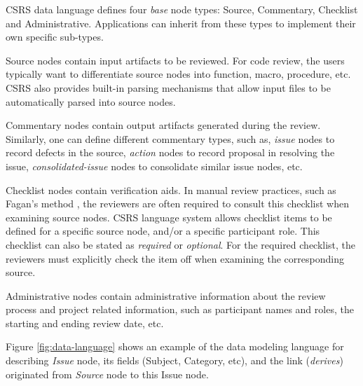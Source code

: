 CSRS data language defines four {\it base} node
types: Source, Commentary, Checklist and Administrative. 
Applications can inherit from these types to implement their own
specific sub-types.

Source nodes contain input artifacts to be reviewed. For code review,
the users typically want to differentiate source nodes into function,
macro, procedure, etc.  CSRS also provides built-in parsing mechanisms
that allow input files to be automatically parsed into source nodes. 

Commentary nodes contain output artifacts generated during the
review. Similarly, one can define different commentary types,
such as, {\it issue} nodes to record defects in the source,
{\it action} nodes to record proposal in resolving the issue, 
{\it consolidated-issue} nodes to consolidate similar issue nodes, etc.

Checklist nodes contain verification aids. In manual review practices,
such as Fagan's method \cite{Fagan76}, the reviewers are often required
to consult this checklist when examining source nodes. CSRS language
system allows checklist items to be defined for a specific source
node, and/or a specific participant role.
This checklist can also be stated as {\it required} or {\it optional}. 
For the required checklist, the reviewers
must explicitly check the item off when examining the corresponding
source. 

Administrative nodes contain administrative information about the
review process and project related information, such as participant names
and roles, the starting and ending review date, etc.

Figure \ref{fig:data-language} 
shows an example of the data modeling language for describing
{\sl Issue} node, its fields (Subject, Category, etc),
and the link ({\sl derives}) originated from {\sl Source} node to this
Issue node. 

